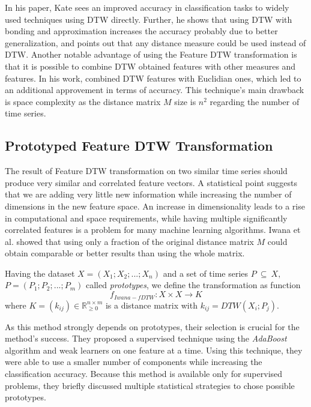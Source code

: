  In his paper, Kate sees an improved accuracy in classification tasks to widely used techniques using DTW directly. Further, he shows that using DTW with bonding and approximation increases the accuracy probably due to better generalization, and points out that any distance measure could be used instead of DTW. Another notable advantage of using the Feature DTW transformation is that it is possible to combine DTW obtained features with other measures and features. In his work, \textcite{met:fDTW} combined DTW features with Euclidian ones, which led to an additional approvement in terms of accuracy. This technique's main drawback is space complexity as the distance matrix $M$ size is $n^2$ regarding the number of time series. 


\subsection{Prototyped Feature DTW Transformation}
The result of Feature DTW transformation on two similar time series should produce very similar and correlated feature vectors. A statistical point suggests that we are adding very little new information while increasing the number of dimensions in the new feature space. An increase in dimensionality leads to a rise in computational and space requirements, while having multiple significantly correlated features is a problem for many machine learning algorithms. Iwana et al. \cite{met:protofDTW} showed that using only a fraction of the original distance matrix $M$ could obtain comparable or better results than using the whole matrix.

Having the dataset $X=(X_1; X_2; ...; X_n)$ and a set of time series $P~ \subseteq~X,$ $P=(P_1; P_2; ...; P_m)$ called \textit{prototypes}, we define the transformation as function
\begin{equation}
    f_{Iwana-fDTW}: X \times X \rightarrow K
\end{equation}
where $K=(k_{ij}) \in \mathbb{R}_{\ge 0}^{n \times m}$ is a distance matrix with $k_{ij}=DTW(X_i; P_j)$.

As this method strongly depends on prototypes, their selection is crucial for the method's success. They proposed a supervised technique using the \textit{AdaBoost} algorithm and weak learners on one feature at a time. Using this technique, they were able to use a smaller number of components while increasing the classification accuracy. Because this method is available only for supervised problems, they briefly discussed multiple statistical strategies to chose possible prototypes.

